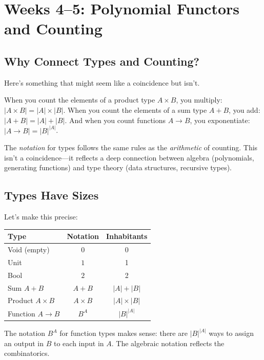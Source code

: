 \documentclass[11pt]{article}
\theoremstyle{definition}
\theoremstyle{plain}
\theoremstyle{remark}
\begin{document}
\section{Weeks 4--5: Polynomial Functors and Counting}

\subsection*{Why Connect Types and Counting?}

Here's something that might seem like a coincidence but isn't.

When you count the elements of a product type $A \times B$, you multiply: $|A \times B| = |A| \times |B|$. When you count the elements of a sum type $A + B$, you add: $|A + B| = |A| + |B|$. And when you count functions $A \to B$, you exponentiate: $|A \to B| = |B|^{|A|}$.

The \emph{notation} for types follows the same rules as the \emph{arithmetic} of counting. This isn't a coincidence---it reflects a deep connection between algebra (polynomials, generating functions) and type theory (data structures, recursive types).

\subsection{Types Have Sizes}

Let's make this precise:

\begin{center}
\begin{tabular}{lcc}
\textbf{Type} & \textbf{Notation} & \textbf{Inhabitants} \\
\hline
Void (empty) & $0$ & 0 \\
Unit & $1$ & 1 \\
Bool & $2$ & 2 \\
Sum $A + B$ & $A + B$ & $|A| + |B|$ \\
Product $A \times B$ & $A \times B$ & $|A| \times |B|$ \\
Function $A \to B$ & $B^A$ & $|B|^{|A|}$ \\
\end{tabular}
\end{center}

The notation $B^A$ for function types makes sense: there are $|B|^{|A|}$ ways to assign an output in $B$ to each input in $A$. The algebraic notation reflects the combinatorics.
\end{document}
